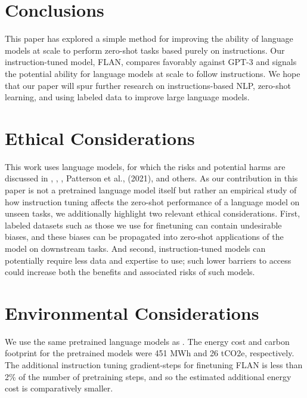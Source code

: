\section{Conclusions}
This paper has explored a simple method for improving the ability of language models at scale to perform zero-shot tasks based purely on instructions. Our instruction-tuned model, FLAN, compares favorably against GPT-3 and signals the potential ability for language models at scale to follow instructions. We hope that our paper will spur further research on instructions-based NLP, zero-shot learning, and using labeled data to improve large language models. 

\section*{Ethical Considerations} This work uses language models, for which the risks and potential harms are discussed in \citet{bender-koller-2020-climbing}, \citet{brown2020language}, \citet{10.1145/3442188.3445922}, Patterson et al., (2021), and others. As our contribution in this paper is not a pretrained language model itself but rather an empirical study of how instruction tuning affects the zero-shot performance of a language model on unseen tasks, we additionally highlight two relevant ethical considerations. First, labeled datasets such as those we use for finetuning can contain undesirable biases, and these biases can be propagated into zero-shot applications of the model on downstream tasks.  And second, instruction-tuned models can potentially require less data and expertise to use; such lower barriers to access could increase both the benefits and associated risks of such models.

\section*{Environmental Considerations} We use the same pretrained language models as \citet{Austin2021ProgramSW}. 
The energy cost and carbon footprint for the pretrained models were 451 MWh and 26 tCO2e, respectively. The additional instruction tuning gradient-steps for finetuning FLAN is less than 2\% of the number of pretraining steps, and so the estimated additional energy cost is comparatively smaller.

